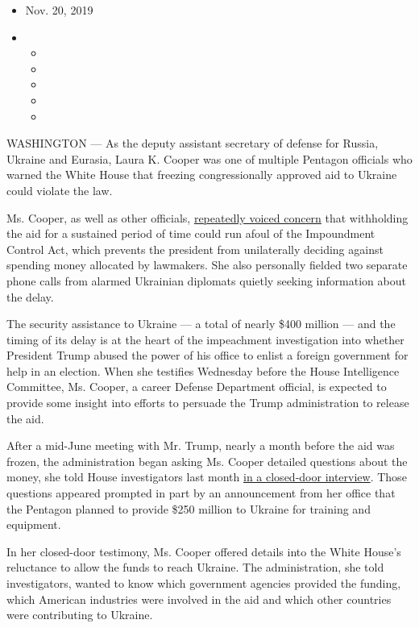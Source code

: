 \begin{itemize}
\item
  Nov. 20, 2019
\item
  \begin{itemize}
  \item
  \item
  \item
  \item
  \item
  \end{itemize}
\end{itemize}

WASHINGTON --- As the deputy assistant secretary of defense for Russia,
Ukraine and Eurasia, Laura K. Cooper was one of multiple Pentagon
officials who warned the White House that freezing congressionally
approved aid to Ukraine could violate the law.

Ms. Cooper, as well as other officials,
\href{https://www.nytimes.com/2019/11/11/us/politics/laura-cooper-dod-impeachment-testimony.html}{repeatedly
voiced concern} that withholding the aid for a sustained period of time
could run afoul of the Impoundment Control Act, which prevents the
president from unilaterally deciding against spending money allocated by
lawmakers. She also personally fielded two separate phone calls from
alarmed Ukrainian diplomats quietly seeking information about the delay.

The security assistance to Ukraine --- a total of nearly \$400 million
--- and the timing of its delay is at the heart of the impeachment
investigation into whether President Trump abused the power of his
office to enlist a foreign government for help in an election. When she
testifies Wednesday before the House Intelligence Committee, Ms. Cooper,
a career Defense Department official, is expected to provide some
insight into efforts to persuade the Trump administration to release the
aid.

After a mid-June meeting with Mr. Trump, nearly a month before the aid
was frozen, the administration began asking Ms. Cooper detailed
questions about the money, she told House investigators last month
\href{https://www.nytimes.com/2019/11/11/us/politics/laura-cooper-dod-impeachment-testimony.html}{in
a closed-door interview}. Those questions appeared prompted in part by
an announcement from her office that the Pentagon planned to provide
\$250 million to Ukraine for training and equipment.

In her closed-door testimony, Ms. Cooper offered details into the White
House's reluctance to allow the funds to reach Ukraine. The
administration, she told investigators, wanted to know which government
agencies provided the funding, which American industries were involved
in the aid and which other countries were contributing to Ukraine.

